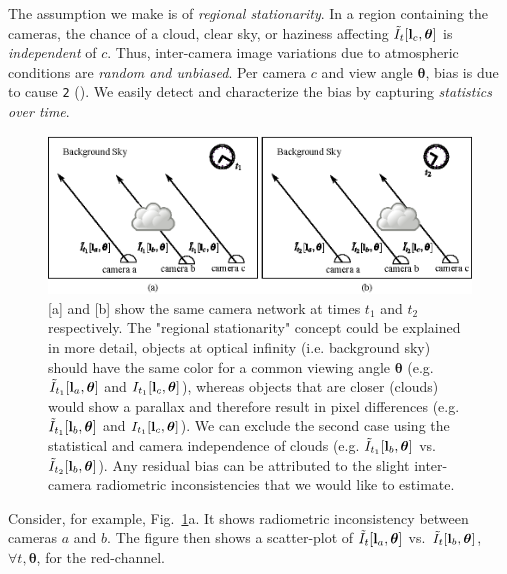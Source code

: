 \documentclass[runningheads]{llncs}
\begin{document}
The assumption we make is of {\em regional stationarity}. In a region containing the cameras, the chance of a cloud, clear sky, or haziness affecting $\tilde I_t[{\bf l}_c,{\bm \theta}]$ is {\em independent} of $c$. Thus, inter-camera image variations due to atmospheric conditions are {\em random and unbiased}. Per camera $c$ and view angle ${\bm \theta}$, bias is due to cause {\tt 2} (). We easily detect and characterize the bias by capturing {\em statistics over time}.
\begin{figure}[t!]
  \begin{center}
    \includegraphics[width=\linewidth]{figures/regional_stationarity.eps}
  \end{center}
  \vspace{-0.6cm}
  \caption{[a] and [b] show the same camera network at times $t_1$ and
    $t_2$ respectively. The "regional stationarity"
concept could be explained in more detail, objects at optical infinity (i.e. background
    sky) should have the same color for a common viewing angle ${\bm
      \theta}$ (e.g. $\tilde I_{t_1}[{\bf l}_a,{\bm \theta}]$ and
    $I_{t_1}[{\bf l}_c,{\bm \theta}]$), whereas objects that are
    closer (clouds) would show a parallax and therefore result in
    pixel differences (e.g. $\tilde I_{t_1}[{\bf l}_b,{\bm \theta}]$
    and $I_{t_1}[{\bf l}_c,{\bm \theta}]$). We can exclude the second
    case using the statistical and camera independence of clouds
    (e.g. $\tilde I_{t_1}[{\bf l}_b,{\bm \theta}]$ vs. $\tilde
    I_{t_2}[{\bf l}_b,{\bm \theta}]$). Any residual bias can be
    attributed to the slight inter-camera radiometric inconsistencies
    that we would like to estimate.  }
  \label{fig:calibration}
\end{figure}
Consider, for example, Fig.~\ref{fig:calibration}a. It shows radiometric inconsistency between cameras $a$ and $b$. The figure then shows a scatter-plot of
$\tilde I_t[{\bf l}_a,{\bm \theta}]$ vs.~$\tilde I_t[{\bf l}_{b},{\bm \theta}]$, $\forall t,{\bm \theta}$, for the red-channel.
\end{document}
